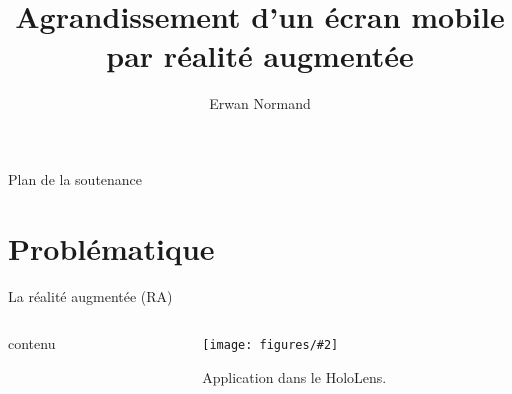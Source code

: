 
\usepackage{lmodern}
\usepackage[french]{babel}
\usepackage[utf8]{inputenc}
\usepackage[T1]{fontenc}


 {
}


\title{Agrandissement d'un écran mobile par réalité augmentée}
\author{Erwan Normand}
\date{}

\newcommand{\twocols}[2]{%
  \begin{columns}%
    \begin{column}{0.5\textwidth}#1\end{column}%
    \begin{column}{0.5\textwidth}#2\end{column}%
  \end{columns}%
}
\newcommand{\captionfigure}[3][1]{%
  \begin{figure}%
    \texttt{[image: figures/\#2]}%
    \caption{#3}%
  \end{figure}%
}



\frame{\maketitle}

\begin{frame}{Plan de la soutenance}
  \tableofcontents
\end{frame}

\section{Problématique} %
\begin{frame}{La réalité augmentée (RA)}
  \twocols{
    contenu
  }{
    \captionfigure{HoloLens_2}{Application dans le HoloLens.}
  }
\end{frame}

